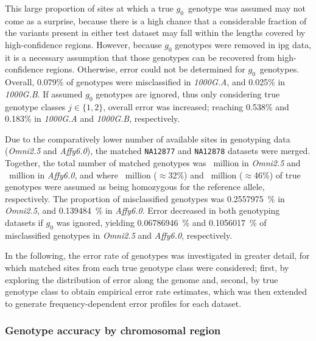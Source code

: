 This large proportion of sites at which a true $g_0$~genotype was assumed may not come as a surprise, because there is a high chance that a considerable fraction of the variants present in either test dataset may fall within the lengths covered by high-confidence regions.
However, because $g_0$ genotypes were removed in \gls{ipg} data, it is a necessary assumption that those genotypes can be recovered from high-confidence regions.
Otherwise, error could not be determined for $g_0$~genotypes.
Overall, 0.079\% of genotypes were misclassified in \emph{1000G.A}, and 0.025\% in \emph{1000G.B}.
If assumed $g_0$ genotypes are ignored, thus only considering true genotype classes ${j \in \lbrace 1,2 \rbrace}$, overall error was increased; reaching 0.538\% and 0.183\% in \emph{1000G.A} and \emph{1000G.B}, respectively.

Due to the comparatively lower number of available sites in genotyping data (\emph{Omni2.5} and \emph{Affy6.0}), the matched \texttt{NA12877} and \texttt{NA12878} datasets were merged.
Together, the total number of matched genotypes was ~million in \emph{Omni2.5} and ~million in \emph{Affy6.0}, and where ~million ($\approx$32\%) and ~million ($\approx$46\%) of true genotypes were assumed as being homozygous for the reference allele, respectively.
The proportion of misclassified genotypes was \SI{0.2557975}{\percent} in \emph{Omni2.5}, and \SI{0.139484}{\percent} in \emph{Affy6.0}.
Error decreased in both genotyping datasets if $g_0$ was ignored, yielding \SI{0.06786946}{\percent} and \SI{0.1056017}{\percent} of misclassified genotypes in \emph{Omni2.5} and \emph{Affy6.0}, respectively.


In the following, the error rate of genotypes was investigated in greater detail, for which matched sites from each true genotype class were considered; first, by exploring the distribution of error along the genome and, second, by true genotype class to obtain empirical error rate estimates, which was then extended to generate frequency-dependent error profiles for each dataset.


%
\subsubsection{Genotype accuracy by chromosomal region}
%

